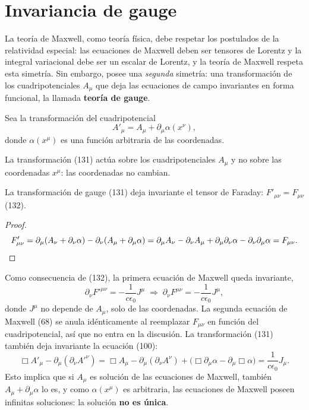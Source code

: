 \section{Invariancia de gauge}

La teoría de Maxwell, como teoría física, debe respetar los postulados de
la relatividad especial: las ecuaciones de Maxwell deben ser tensores de
Lorentz y la integral variacional debe ser un escalar de Lorentz, y la
teoría de Maxwell respeta esta simetría. Sin embargo, posee una
\emph{segunda} simetría: una transformación de los cuadripotenciales
$A_\mu$ que deja las ecuaciones de campo invariantes en forma funcional,
la llamada \textbf{teoría de gauge}.

\begin{definicion}
Sea la transformación del cuadripotencial
\[
A'_\mu=A_\mu+\partial_\mu\alpha(x^\nu), \tag{131}
\]
donde $\alpha(x^\mu)$ es una función arbitraria de las coordenadas.
\end{definicion}

La transformación (131) actúa sobre los cuadripotenciales $A_\mu$ y no
sobre las coordenadas $x^\mu$: las coordenadas no cambian.

\begin{proposicionc}
La transformación de gauge (131) deja invariante el tensor de Faraday:
$F'_{\mu\nu}=F_{\mu\nu}$ (132).
\end{proposicionc}

\begin{proof}
\[
F'_{\mu\nu}=\partial_\mu(A_\nu+\partial_\nu\alpha)-\partial_\nu(A_\mu+
\partial_\mu\alpha)=\partial_\mu A_\nu-\partial_\nu A_\mu+\partial_\mu
\partial_\nu\alpha-\partial_\nu\partial_\mu\alpha=F_{\mu\nu}. \qedhere
\]
\end{proof}

Como consecuencia de (132), la primera ecuación de Maxwell queda
invariante,
\[
\partial_\nu F'^{\mu\nu}=-\frac{1}{c\epsilon_0}J^\mu\;\Longrightarrow\;
\partial_\nu F^{\mu\nu}=-\frac{1}{c\epsilon_0}J^\mu, \tag{133}
\]
donde $J^\mu$ no depende de $A_\mu$, solo de las coordenadas. La segunda
ecuación de Maxwell (68) se anula idénticamente al reemplazar $F_{\mu\nu}$
en función del cuadripotencial, así que no entra en la discusión. La
transformación (131) también deja invariante la ecuación (100):
\[
\Box A'_\mu-\partial_\mu(\partial_\nu A'^\nu)=\Box A_\mu-\partial_\mu
(\partial_\nu A^\nu)+\big(\Box\partial_\mu\alpha-\partial_\mu\Box\alpha
\big)=\frac{1}{c\epsilon_0}J_\mu .
\]
Esto implica que si $A_\mu$ es solución de las ecuaciones de Maxwell,
también $A_\mu+\partial_\mu\alpha$ lo es, y como $\alpha(x^\mu)$ es
arbitraria, las ecuaciones de Maxwell poseen infinitas soluciones: la
solución \textbf{no es única}.

